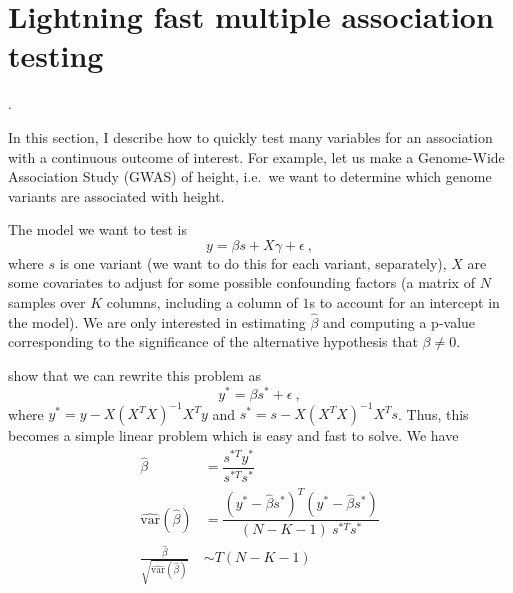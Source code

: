 \section{Lightning fast multiple association testing}.

In this section, I describe how to quickly test many variables for an association with a continuous outcome of interest. For example, let us make a Genome-Wide Association Study (GWAS) of height, i.e.\ we want to determine which genome variants are associated with height.

The model we want to test is $$y = \beta s + X \gamma + \epsilon~,$$ where $s$ is one variant (we want to do this for each variant, separately), $X$ are some covariates to adjust for some possible confounding factors (a matrix of $N$ samples over $K$ columns, including a column of $1$s to account for an intercept in the model). 
We are only interested in estimating $\hat{\beta}$ and computing a p-value corresponding to the significance of the alternative hypothesis that $\beta \neq 0$.

\cite{sikorska2013gwas} show that we can rewrite this problem as $$y^* = \beta s^* + \epsilon~,$$ where $y^* = y - X (X^T X)^{-1} X^T y$ and $s^* = s - X (X^T X)^{-1} X^T s$. Thus, this becomes a simple linear problem which is easy and fast to solve. We have
\begin{align*}
\hat{\beta} &= \dfrac{s^{*T} y^*}{s^{*T} s^*} \\
\widehat{\text{var}}(\hat{\beta}) &= \dfrac{(y^* - \hat{\beta} s^*)^T (y^* - \hat{\beta} s^*)}{(N - K - 1) ~ s^{*T} s^*} \\
\frac{\hat{\beta}}{\sqrt{\widehat{\text{var}}(\hat{\beta})}} &\sim T(N - K - 1)
\end{align*}

